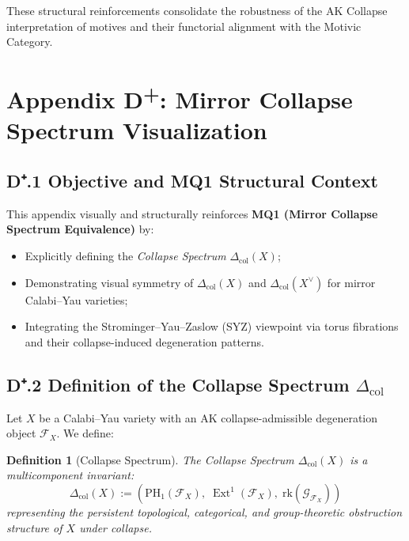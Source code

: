 \documentclass[11pt]{article}
\newtheorem{definition}[theorem]{Definition}
\DeclareMathOperator{\Ext}{Ext}
\begin{document}
These structural reinforcements consolidate the robustness of the AK Collapse interpretation of motives and their functorial alignment with the Motivic Category.

\FloatBarrier




\section*{Appendix D\textsuperscript{+}: Mirror Collapse Spectrum Visualization}

\subsection*{D⁺.1 Objective and MQ1 Structural Context}

This appendix visually and structurally reinforces \textbf{MQ1 (Mirror Collapse Spectrum Equivalence)} by:

\begin{itemize}
    \item Explicitly defining the \emph{Collapse Spectrum} $\Delta_{\mathrm{col}}(X)$;
    \item Demonstrating visual symmetry of $\Delta_{\mathrm{col}}(X)$ and $\Delta_{\mathrm{col}}(X^{\vee})$ for mirror Calabi--Yau varieties;
    \item Integrating the Strominger–Yau–Zaslow (SYZ) viewpoint via torus fibrations and their collapse-induced degeneration patterns.
\end{itemize}

\subsection*{D⁺.2 Definition of the Collapse Spectrum $\Delta_{\mathrm{col}}$}

Let $X$ be a Calabi--Yau variety with an AK collapse-admissible degeneration object $\mathcal{F}_X$. We define:

\begin{definition}[Collapse Spectrum]
The \emph{Collapse Spectrum} $\Delta_{\mathrm{col}}(X)$ is a multicomponent invariant:
\[
\Delta_{\mathrm{col}}(X) := \left( \mathrm{PH}_1(\mathcal{F}_X), \; \Ext^1(\mathcal{F}_X), \; \mathrm{rk}(\mathcal{G}_{\mathcal{F}_X}) \right)
\]
representing the persistent topological, categorical, and group-theoretic obstruction structure of $X$ under collapse.
\end{definition}
\end{document}
